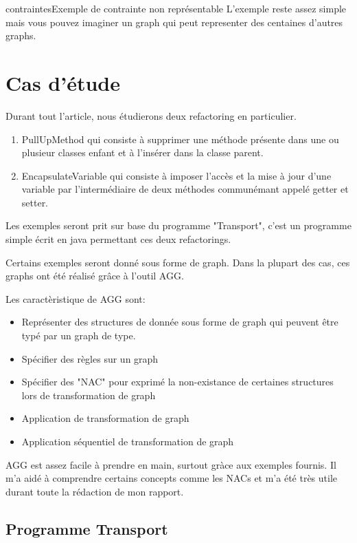 \documentclass[a4paper, 12pt]{article}
\begin{document}
\begin{figu}{contraintes}{Exemple de contrainte non représentable}
L'exemple reste assez simple mais vous pouvez imaginer un graph qui peut representer des centaines d'autres graphs.

\section{Cas d'étude}

Durant tout l'article, nous étudierons deux refactoring en particulier.

\begin{enumerate}
\item PullUpMethod qui consiste à supprimer une méthode présente dans une ou plusieur classes enfant et à l'insérer dans la classe parent.
\item EncapsulateVariable qui consiste à imposer l'accès et la mise à jour d'une variable par l'intermédiaire de deux méthodes communémant appelé getter et setter.
\end{enumerate}

Les exemples seront prit sur base du programme "Transport", c'est un programme simple écrit en java permettant ces deux refactorings.

Certains exemples seront donné sous forme de graph. Dans la plupart des cas, ces graphs ont été réalisé grâce à l'outil AGG.

Les caractèristique de AGG sont:

\begin{itemize}[label=\textbullet]
\item Représenter des structures de donnée sous forme de graph qui peuvent être typé par un graph de type.
\item Spécifier des règles sur un graph
\item Spécifier des "NAC" pour exprimé la non-existance de certaines structures lors de transformation de graph
\item Application de transformation de graph
\item Application séquentiel de transformation de graph
\end{itemize}

AGG est assez facile à prendre en main, surtout gràce aux exemples fournis. Il m'a aidé à comprendre certains concepts comme les NACs et m'a été très utile durant toute la rédaction de mon rapport.

\subsection{Programme Transport}


\end{figu}
\end{document}
